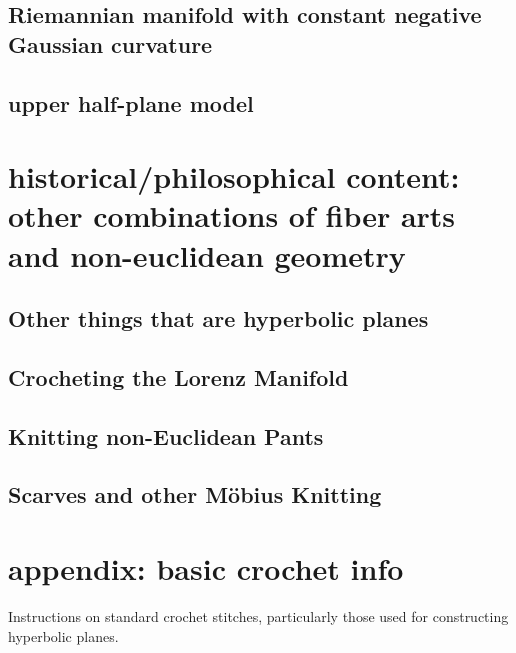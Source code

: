 \documentclass{article}
\begin{document}
\subsection{Riemannian manifold with constant negative Gaussian curvature}
\subsection{upper half-plane model}

\section{historical/philosophical content: other combinations of fiber arts and non-euclidean geometry}
\subsection{Other things that are hyperbolic planes\cite{adventures}}
\subsection{Crocheting the Lorenz Manifold \cite{crochetlorenz}}
\subsection{Knitting non-Euclidean Pants \cite{makingmath}}
\subsection{Scarves and other M\"obius Knitting \cite{magicalknitting}\cite{magicalknitting2}}

\section{appendix: basic crochet info}
Instructions on standard crochet stitches, particularly those used for constructing hyperbolic planes. \cite{happyhooker}

\newpage


\end{document}
